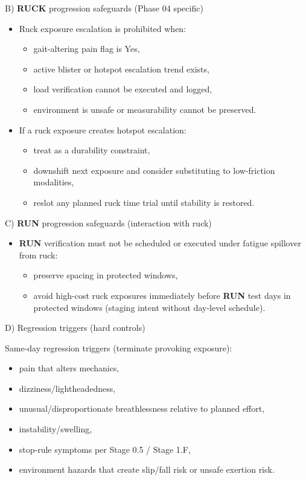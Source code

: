 \documentclass[10pt]{article}
\begin{document}
B) \textbf{RUCK} progression safeguards (Phase 04 specific)

\begin{itemize}
\item Ruck exposure escalation is prohibited when:
  \begin{itemize}
  \item gait-altering pain flag is Yes,
  \item active blister or hotspot escalation trend exists,
  \item load verification cannot be executed and logged,
  \item environment is unsafe or measurability cannot be preserved.
  \end{itemize}
\item If a ruck exposure creates hotspot escalation:
  \begin{itemize}
  \item treat as a durability constraint,
  \item downshift next exposure and consider substituting to low-friction modalities,
  \item reslot any planned ruck time trial until stability is restored.
  \end{itemize}
\end{itemize}

C) \textbf{RUN} progression safeguards (interaction with ruck)

\begin{itemize}
\item \textbf{RUN} verification must not be scheduled or executed under fatigue spillover from ruck:
  \begin{itemize}
  \item preserve spacing in protected windows,
  \item avoid high-cost ruck exposures immediately before \textbf{RUN} test days in protected windows (staging intent without day-level schedule).
  \end{itemize}
\end{itemize}

D) Regression triggers (hard controls)

Same-day regression triggers (terminate provoking exposure):

\begin{itemize}
\item pain that alters mechanics,
\item dizziness/lightheadedness,
\item unusual/disproportionate breathlessness relative to planned effort,
\item instability/swelling,
\item stop-rule symptoms per Stage 0.5 / Stage 1.F,
\item environment hazards that create slip/fall risk or unsafe exertion risk.
\end{itemize}
\end{document}
